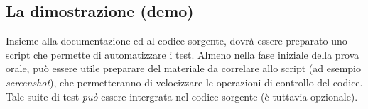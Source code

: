 \documentclass[
]{article}
\begin{document}
\hypertarget{la-dimostrazione-demo}{%
\subsection{La dimostrazione (demo)}\label{la-dimostrazione-demo}}

Insieme alla documentazione ed al codice sorgente, dovrà essere
preparato uno script che permette di automatizzare i test. Almeno nella
fase iniziale della prova orale, può essere utile preparare del
materiale da correlare allo script (ad esempio \emph{screenshot}), che
permetteranno di velocizzare le operazioni di controllo del codice. Tale
suite di test \emph{può} essere intergrata nel codice sorgente (è
tuttavia opzionale).
\end{document}

